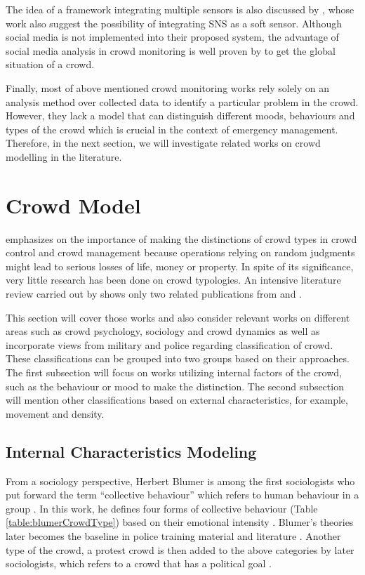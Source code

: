 The idea of a framework integrating multiple sensors is also discussed by \citet{Ramesh2014}, whose work also suggest the possibility of integrating SNS as a soft sensor. Although social media is not implemented into their proposed system, the advantage of social media analysis in crowd monitoring is well proven by \citet{DelirHaghighi2013} to get the global situation of a crowd.

Finally, most of above mentioned crowd monitoring works rely solely on an analysis method over collected data to identify a particular problem in the crowd. However, they lack a model that can distinguish different moods, behaviours and types of the crowd which is crucial in the context of emergency management. Therefore, in the next section, we will investigate related works on crowd modelling in the literature.

\section{Crowd Model}

\citet{Berlonghi1995} emphasizes on the importance of making the distinctions of crowd types in crowd control and crowd management because operations relying on random judgments might lead to serious losses of life, money or property. In spite of its significance, very little research has been done on crowd typologies. An intensive literature review carried out by \citet{Challenger2009} shows only two related publications from \citet{Momboisse1967} and \citet{Berlonghi1995}.

This section will cover those works and also consider relevant works on different areas such as crowd psychology, sociology and crowd dynamics as well as incorporate views from military and police regarding classification of crowd. These classifications can be grouped into two groups based on their approaches. The first subsection will focus on works utilizing internal factors of the crowd, such as the behaviour or mood to make the distinction. The second subsection will mention other classifications based on external characteristics, for example, movement and density.

\subsection{Internal Characteristics Modeling}

From a sociology perspective, Herbert Blumer is among the first sociologists who put forward the term ``collective behaviour'' which refers to human behaviour in a group \citep{Blumer1951}. In this work, he defines four forms of collective behaviour (Table \ref{table:blumerCrowdType}) based on their emotional intensity \citep{Imhonopi2013}. Blumer’s theories later becomes the baseline in police training material and literature \citep{Schweingruber2000}. Another type of the crowd, a protest crowd is then added to the above categories by later sociologists, which refers to a crowd that has a political goal \citep{Imhonopi2013}.

